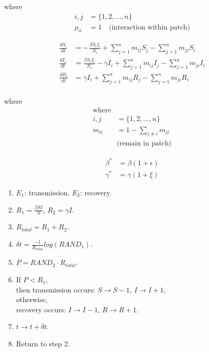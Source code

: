 \documentclass[14pt]{extarticle}
\begin{document}
	where
	\begin{align*}
	i,j &= \{1,2,...,n\}\\
	\rho_{ii} &= 1 \quad\text{(interaction within patch)}
	\end{align*}
	
		\newpage
	
	\begin{align*}
	\frac{dS_i}{dt} &= -\frac{\beta S_iI_i}{N_i} + \sum_{j=1}^{n}m_{ij}S_j - \sum_{j=1}^{n}m_{ji}S_i\\[0.5em]
	\frac{dI_i}{dt} &= \frac{\beta S_iI_i}{N_i} - \gamma I_i + \sum_{j=1}^{n}m_{ij}I_j - \sum_{j=1}^{n}m_{ji}I_i\\[0.5em]
	\frac{dR_i}{dt} &= \gamma I_i + \sum_{j=1}^{n}m_{ij}R_j - \sum_{j=1}^{n}m_{ji}R_i \\[0.5em]
	\end{align*}
	
	where
	\begin{align*}
	\text{where}\\
	i,j &= \{1,2,...,n\}\\
	m_{ii} &= 1 - \sum_{j\neq i} m_{ji}\\ &\text{(remain in patch)}
	\end{align*}
	
	\newpage
	
	\begin{align*}
	\beta^* &= \beta(1+\epsilon)\\[0.5em]
	\gamma^* &= \gamma(1+\xi)	
	\end{align*}
	
	\newpage
	
	\begin{enumerate}
		\item $E_1$: transmission, $E_2$: recovery.
		\item $R_1 = \frac{\beta SI}{N}$, $R_2 = \gamma I$.
		\item $R_{total} = R_1 + R_2$.
		\item $\delta t = \frac{-1}{R_{total}}log(RAND_1)$.
		\item $P = RAND_2 \cdot R_{total}$.
		\item If $P < R_1$, \\
		then transmission occurs: $S \rightarrow S-1$, $I \rightarrow I+1$, \\
		otherwise,\\
		recovery occurs: $I \rightarrow I-1$, $R\rightarrow R+1$.
		\item $t \rightarrow t+\delta t$.
		\item Return to step 2.
	\end{enumerate}
	
\end{document}
